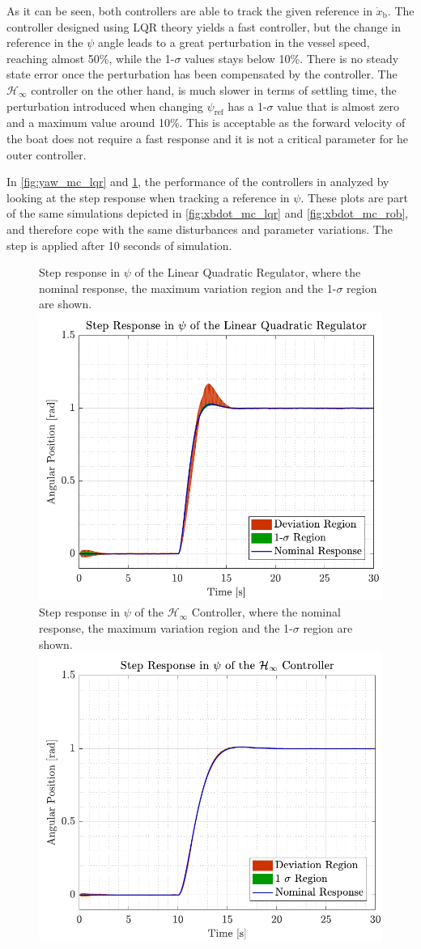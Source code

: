 As it can be seen, both controllers are able to track the given reference in $\dot{x}_\mathrm{b}$. The controller designed using LQR theory yields a fast controller, but the change in reference in the $\psi$ angle leads to a great perturbation in the vessel speed, reaching almost 50\%, while the 1-$\sigma$ values stays below 10\%. There is no steady state error once the perturbation has been compensated by the controller. The $\mathcal{H}_\infty$ controller on the other hand, is much slower in terms of settling time, the perturbation introduced when changing $\psi_\mathrm{ref}$ has a 1-$\sigma$ value that is almost zero and a maximum value around 10\%. This is acceptable as the forward velocity of the boat does not require a fast response and it is not a critical parameter for he outer controller.

In \autoref{fig:yaw_mc_lqr} and \ref{fig:yaw_mc_rob}, the performance of the controllers in analyzed by looking at the step response when tracking a reference in $\psi$. These plots are part of the same simulations depicted in \autoref{fig:xbdot_mc_lqr} and \ref{fig:xbdot_mc_rob}, and therefore cope with the same disturbances and parameter variations. The step is applied after 10 seconds of simulation.
\begin{figure}[H]
    \captionbox 
    {   
        Step response in $\psi$ of the Linear Quadratic Regulator, where the nominal response, the maximum variation region and the 1-$\sigma$ region are shown.
        \label{fig:yaw_mc_lqr}
    }                                                                 
    {                                                                  
        \includegraphics[width=.45\textwidth]{figures/yaw_mc_lqr}         
    }                                                                    
    \hspace{5pt}                                                          
    \captionbox  
    {   
        Step response in $\psi$ of the $\mathcal{H}_\infty$ Controller, where the nominal response, the maximum variation region and the 1-$\sigma$ region are shown.   
        \label{fig:yaw_mc_rob}
    }                                                                          
    {
        \includegraphics[width=.45\textwidth]{figures/yaw_mc_rob}
    }
\end{figure}
